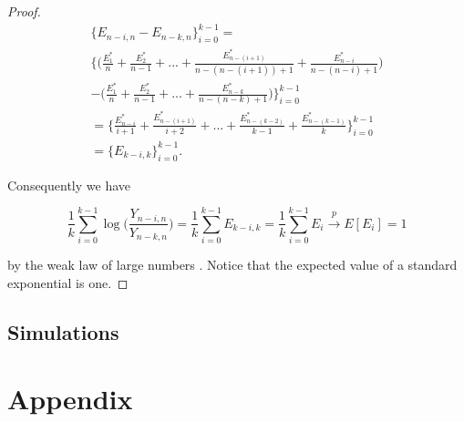 \documentclass[english,12pt,a4paper,pdftex,sci,utf8]{aaltothesis} %
\begin{document}
\begin{proof}
\begin{equation*}
\begin{split}
\big\{E_{n-i,n} - E_{n-k,n}\big\}_{i=0}^{k-1} =\\
\bigg\{\Big( \frac{E_1^*}{n} + \frac{E_2^*}{n-1}+...+ \frac{E_{n-(i+1)}^*}{n-(n-(i+1))+1} + \frac{E_{n-i}^*}{n-(n-i)+1} \Big) \\
- \Big(\frac{E_1^*}{n} + \frac{E_2^*}{n-1}+...+\frac{E_{n-k}^*}{n-(n-k)+1}\Big)\bigg\}_{i=0}^{k-1} \\
= \bigg\{\frac{E_{n-i}^*}{i+1} + \frac{E_{n-(i+1)}^*}{i+2} +...+ \frac{E_{n-(k-2)}^*}{k-1} + \frac{E_{n-(k-1)}^*}{k}\bigg\}_{i=0}^{k-1} \\
= \big\{E_{k-i,k}\big\}_{i=0}^{k-1}.
\end{split}
\end{equation*}

Consequently we have

\begin{equation}
\frac{1}{k} \sum_{i=0}^{k-1} \log\Big(\frac{Y_{n-i,n}}{Y_{n-k,n}}\Big) = \frac{1}{k} \sum_{i=0}^{k-1} E_{k-i,k} = \frac{1}{k} \sum_{i=0}^{k-1} E_i \xrightarrow{p} E[E_i] = 1
\end{equation}

by the weak law of large numbers \cite{rosenthal}. Notice that the expected value of a standard exponential is one.



\end{proof}



\subsection{Simulations} 


\clearpage

{}



\clearpage

\thesisappendix

\section*{Appendix}
\end{document}
